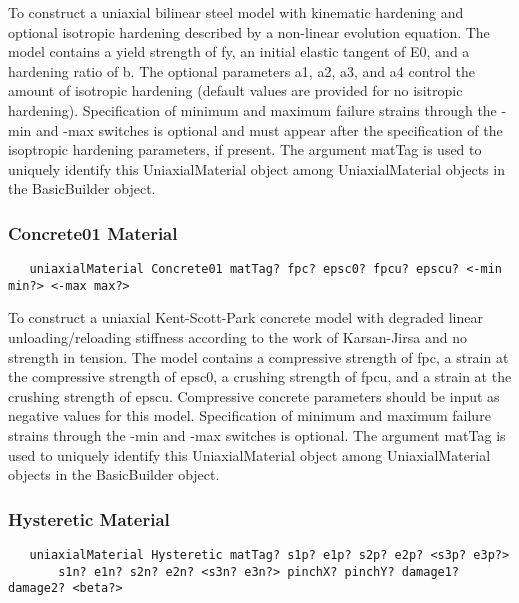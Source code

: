 \documentclass[12pt]{article}
\begin{document}
\noindent To construct a uniaxial bilinear steel model with kinematic
hardening and optional isotropic hardening described by a non-linear
evolution equation. The model contains a yield strength of fy, an
initial elastic tangent of E0, and a hardening ratio of b. The
optional parameters a1, a2, a3, and a4 control the amount of isotropic
hardening (default values are provided for no isitropic
hardening). Specification of minimum and maximum failure strains 
through the -min and -max switches is optional and must appear after
the specification of the isoptropic hardening parameters, if
present. The argument matTag is used to uniquely identify this
UniaxialMaterial object among UniaxialMaterial objects in the
BasicBuilder object. 

\subsubsection{Concrete01 Material}
{\sf\small
\begin{verbatim}
   uniaxialMaterial Concrete01 matTag? fpc? epsc0? fpcu? epscu? <-min min?> <-max max?>
\end{verbatim}
}

\noindent To construct a uniaxial Kent-Scott-Park concrete model with degraded 
linear unloading/reloading stiffness according to the work of Karsan-Jirsa and no
strength in tension. The model contains a compressive strength of fpc,
a strain at the compressive strength of epsc0, a crushing strength of
fpcu, and a strain at the crushing strength of epscu. Compressive
concrete parameters should be input as negative values for
this model. Specification of minimum and maximum
failure strains through the -min and -max switches is optional. The argument 
matTag is used to uniquely identify this UniaxialMaterial object among 
UniaxialMaterial objects in the BasicBuilder object.

\subsubsection{Hysteretic Material}
{\sf\small
\begin{verbatim}
   uniaxialMaterial Hysteretic matTag? s1p? e1p? s2p? e2p? <s3p? e3p?>
       s1n? e1n? s2n? e2n? <s3n? e3n?> pinchX? pinchY? damage1? damage2? <beta?>
\end{verbatim}
}
\end{document}
